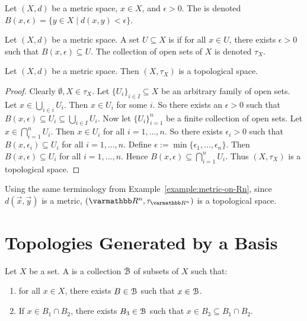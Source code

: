 \begin{definition}
    Let $(X,d)$ be a metric space, $x \in X$, and $\epsilon > 0$. The   is denoted $B(x,\epsilon) = \{y \in X \mid d(x,y) < \epsilon\}$.
\end{definition}

\begin{definition}
    Let $(X,d)$ be a metric space. A set $U \subseteq X$ is  if for all $x \in U$, there exists $\epsilon >0$ such that $B(x,\epsilon) \subseteq U$. The collection of open sets of $X$ is denoted $\tau_X$.
\end{definition}

\begin{proposition}
    Let $(X,d)$ be a metric space. Then $(X,\tau_X)$ is a topological space.
\end{proposition}
    \begin{proof}
        Clearly $\emptyset,X \in \tau_X$. Let $\{U_i\}_{i \in I} \subseteq X$ be an arbitrary family of open sets. Let $x \in \bigcup_{i \in i}U_i$. Then $x \in U_i$ for some $i$. So there exists an $\epsilon > 0$ such that $B(x,\epsilon) \subseteq U_i \subseteq \bigcup_{i \in I}U_i$. Now let $\{U_i\}_{i = 1}^n$ be a finite collection of open sets. Let $x \in \bigcap_{i = 1}^n U_i$. Then $x \in U_i$ for all $i = 1,...,n$. So there exists $\epsilon_i > 0$ such that $B(x,\epsilon_i) \subseteq U_i$ for all $i = 1,...,n$. Define $\epsilon := \min\{\epsilon_1,...,\epsilon_n\}$. Then $B(x,\epsilon) \subseteq U_i$ for all $i=1,...,n$. Hence $B(x,\epsilon) \subseteq \bigcap_{i = 1}^n U_i$. Thus $(X,\tau_X)$ is a topological space.
    \end{proof}

\begin{example}
    Using the same terminology from Example~\ref{example:metric-on-Rn}, since $d(\vec{x},\vec{y})$ is a metric, $(\bfR^n, \tau_{\bfR^n})$ is a topological space.
\end{example}

\section{Topologies Generated by a Basis}
\begin{definition}
    Let $X$ be a set. A  is a collection $\mathcal{B}$ of subsets of $X$ such that:
        \begin{enumerate}[label = (\arabic*),itemsep=1pt,topsep=3pt]
            \item for all $x \in X$, there exists $B \in \mathcal{B}$ such that $x \in \mathcal{B}$.
            \item If $x \in B_1 \cap B_2$, there exists $B_3 \in \mathcal{B}$ such that $x \in B_3 \subseteq B_1 \cap B_2$.
        \end{enumerate}
\end{definition}

